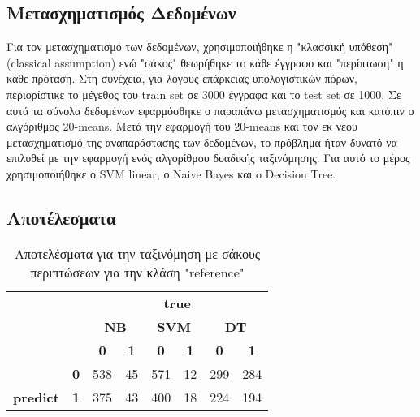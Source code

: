 \subsection{Μετασχηματισμός Δεδομένων}

Για τον μετασχηματισμό των δεδομένων, χρησιμοποιήθηκε η "κλασσική υπόθεση" (classical assumption) ενώ "σάκος" θεωρήθηκε το κάθε έγγραφο και "περίπτωση" η κάθε πρόταση.
Στη συνέχεια, για λόγους επάρκειας υπολογιστικών πόρων, περιορίστικε το μέγεθος του train set σε 3000 έγγραφα και το test set σε 1000. Σε αυτά τα σύνολα δεδομένων εφαρμόσθηκε ο παραπάνω μετασχηματισμός και κατόπιν ο αλγόριθμος 20-means. Μετά την εφαρμογή του 20-means και τον εκ νέου μετασχηματισμό της αναπαράστασης των δεδομένων, το πρόβλημα ήταν δυνατό να επιλυθεί με την εφαρμογή ενός αλγορίθμου δυαδικής ταξινόμησης. Για αυτό το μέρος χρησιμοποιήθηκε ο SVM linear, ο Naive Bayes και o Decision Tree.

\subsection{Αποτέλεσματα}





\begin{table}[]
	\centering
	\caption{Αποτελέσματα για την ταξινόμηση με σάκους περιπτώσεων για την κλάση "reference"}
	\label{tab: bags of instances}
	\begin{tabular}{|c|c|c|c||c|c||c|c|}
		\hline
		\multicolumn{2}{|c|}{{\color[HTML]{343434} }}                   & \multicolumn{6}{c|}{\textbf{true}}                                            \\ \cline{3-8} 
		\multicolumn{2}{|c|}{{\color[HTML]{343434} }}                   & \multicolumn{2}{c||}{\textbf{NB}} & \multicolumn{2}{c||}{\textbf{SVM}} & \multicolumn{2}{c|}{\textbf{DT}}\\ \cline{3-8} 
		\multicolumn{2}{|c|}{\multirow{-3}{*}{{\color[HTML]{343434} }}} & \textbf{0}          & \textbf{1}          & \textbf{0}      & \textbf{1}  & \textbf{0}      & \textbf{1}    \\ \hline
		& \textbf{0}         & 538                 & 45                  & 571             & 12 &299 &284              \\ \cline{2-8} 
		\multirow{-2}{*}{\textbf{predict}}         & \textbf{1}         & 375                 & 43                  & 400             & 18 &224 &194               \\ \hline
	\end{tabular}
\end{table}


